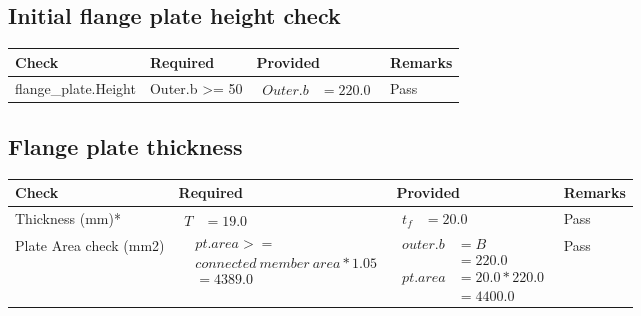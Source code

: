 \documentclass{article}%
\begin{document}
%
\newpage%
\subsection{Initial flange plate height check}%
\label{subsec:Initialflangeplateheightcheck}%
\renewcommand{\arraystretch}{1.2}%
\begin{longtable}{|p{4.5cm}|p{2.5cm}|p{7cm}|p{1.5cm}|}%
\hline%
\rowcolor{OsdagGreen}%
Check&Required&Provided&Remarks\\%
\hline%
\endhead%
\hline%
flange\_plate.Height&Outer.b >= 50&$\begin{aligned} Outer.b &=220.0\end{aligned}$&Pass\\%
\hline%
\end{longtable}

%
\newpage%
\subsection{Flange plate thickness}%
\label{subsec:Flangeplatethickness}%
\renewcommand{\arraystretch}{1.2}%
\begin{longtable}{|p{2.5cm}|p{4.5cm}|p{7cm}|p{1.5cm}|}%
\hline%
\rowcolor{OsdagGreen}%
Check&Required&Provided&Remarks\\%
\hline%
\endhead%
\hline%
Thickness (mm)*&$\begin{aligned} T &=19.0\end{aligned}$&$\begin{aligned} t_f &=20.0\end{aligned}$&Pass\\%
\hline%
Plate Area check (mm2)&$\begin{aligned} &pt.area >= \\&connected~member~area * 1.05\\  &= 4389.0\end{aligned}$&$\begin{aligned} outer.b &= B\\ &= 220.0\\  pt.area &= 20.0 * 220.0\\ &= 4400.0\end{aligned}$&Pass\\%
\hline%
\end{longtable}

%
\newpage%
\end{document}
